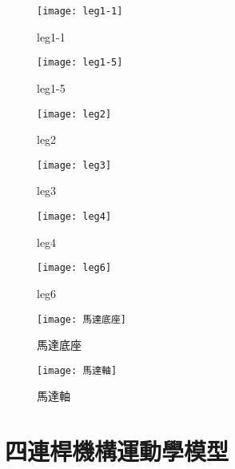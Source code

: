 \begin{figure}[htbp]
  \begin{minipage}[t]{0.3\linewidth}
    \centering
    \texttt{[image: leg1-1]}
    \caption{leg1-1}
    \label{leg1-1}
  \end{minipage}
  \hfill
  \begin{minipage}[t]{0.3\linewidth}
    \centering
    \texttt{[image: leg1-5]}
    \caption{leg1-5}
    \label{leg1-5}
  \end{minipage}
  \hfill
  \begin{minipage}[t]{0.3\linewidth}
    \centering
    \texttt{[image: leg2]}
    \caption{leg2}
    \label{leg2}
  \end{minipage}
\end{figure}

\begin{figure}[htbp]
  \begin{minipage}[t]{0.3\linewidth}
    \centering
    \texttt{[image: leg3]}
    \caption{leg3}
    \label{leg3}
  \end{minipage}
  \hfill
  \begin{minipage}[t]{0.3\linewidth}
    \centering
    \texttt{[image: leg4]}
    \caption{leg4}
    \label{leg4}
  \end{minipage}
  \hfill
  \begin{minipage}[t]{0.3\linewidth}
    \centering
    \texttt{[image: leg6]}
    \caption{leg6}
    \label{leg6}
  \end{minipage}
\end{figure}

\begin{figure}[htbp]
  \begin{minipage}[t]{0.45\linewidth}
    \centering
    \texttt{[image: 馬達底座]}
    \caption{馬達底座}
    \label{馬達底座}
  \end{minipage}
  \hfill
  \begin{minipage}[t]{0.45\linewidth}
    \centering
    \texttt{[image: 馬達軸]}
    \caption{馬達軸}
    \label{馬達軸}
  \end{minipage}
\end{figure}

\newpage

\section{四連桿機構運動學模型}

